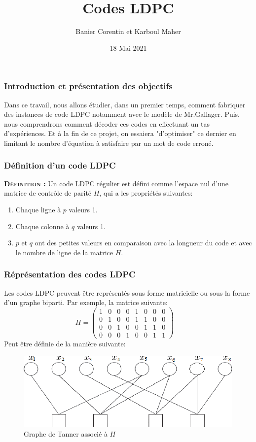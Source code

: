 \documentclass{beamer}
\title{Codes LDPC}
\author{Banier Corentin et Karboul Maher}
\institute{Université de Bordeaux}
\date{18 Mai 2021}
\begin{document}
	\begin{frame}
        \titlepage
	\end{frame}

    \begin{frame}
        \frametitle{Introduction et présentation des objectifs}
        Dans ce travail, nous allons étudier, dans un premier temps, comment fabriquer des instances de code LDPC notamment avec le modèle de Mr.Gallager. 
        Puis, nous comprendrons comment décoder ces codes en effectuant un tas d'expériences. Et à la fin de ce projet, on essaiera "d'optimiser" ce dernier en 
        limitant le nombre d'équation à satisfaire par un mot de code erroné.
    \end{frame}

    \begin{frame}
        \frametitle{Définition d'un code LDPC}
        \textsc{\textbf{\underline{Définition :}}} Un code LDPC régulier est défini comme l'espace nul d'une matrice de contrôle de parité $H$, qui a les propriétés suivantes:
        \begin{enumerate}
            \item Chaque ligne à $p$ valeurs 1.
            \item Chaque colonne à $q$ valeurs 1.
            \item $p$ et $q$ ont des petites valeurs en comparaison avec la longueur du code et avec le nombre de ligne de la matrice $H$.
        \end{enumerate}
    \end{frame}

    \begin{frame}
        \frametitle{Réprésentation des codes LDPC}
        Les codes LDPC peuvent être représentés sous forme matricielle ou sous la forme d'un graphe biparti.
        \newline Par exemple, la matrice suivante:
        $$H=
        \begin{pmatrix}
            1 & 0 & 0 & 0 & 1 & 0 & 0 & 0 \\
            0 & 1 & 0 & 0 & 1 & 1 & 0 & 0 \\
            0 & 0 & 1 & 0 & 0 & 1 & 1 & 0 \\
            0 & 0 & 0 & 1 & 0 & 0 & 1 & 1 
        \end{pmatrix}
        \quad
        $$
        Peut être définie de la manière suivante:
        \begin{figure}[!h]
            \centering
            \includegraphics[scale=0.5]{Tanner2.png}  
            \caption{Graphe de Tanner associé à $H$}
            \label{fig:Tanner2}
        \end{figure}
    \end{frame}
\end{document}
